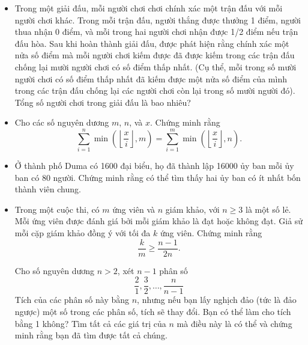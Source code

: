 \documentclass[11pt]{scrartcl}
\begin{document}
\begin{itemize}[label=, leftmargin=0em, itemsep=-0em]
    \item\begin{btvn}
        Trong một giải đấu, mỗi người chơi chơi chính xác một trận đấu với mỗi người chơi khác. Trong mỗi trận đấu, người thắng được thưởng 1 điểm, người thua nhận 0 điểm, và mỗi trong hai người chơi nhận được 1/2 điểm nếu trận đấu hòa. Sau khi hoàn thành giải đấu, được phát hiện rằng chính xác một nửa số điểm mà mỗi người chơi kiếm được đã được kiếm trong các trận đấu chống lại mười người chơi có số điểm thấp nhất. (Cụ thể, mỗi trong số mười người chơi có số điểm thấp nhất đã kiếm được một nửa số điểm của mình trong các trận đấu chống lại các người chơi còn lại trong số mười người đó). Tổng số người chơi trong giải đấu là bao nhiêu?
    \end{btvn}

    \item \begin{btvn}
        Cho các số nguyên dương $m$, $n$, và $x$. Chứng minh rằng
        \[ \sum_{i = 1}^n \min\left(\left\lfloor \frac{x}{i} \right\rfloor, m \right) = \sum_{i = 1}^m \min\left(\left\lfloor \frac{x}{i} \right\rfloor, n \right). \]
        
    \end{btvn}
    \item \begin{btvn}
        Ở thành phố Duma có 1600 đại biểu, họ đã thành lập 16000 ủy ban mỗi ủy ban có 80 người. Chứng minh rằng có thể tìm thấy hai ủy ban có ít nhất bốn thành viên chung.
    \end{btvn}
    \item \begin{btvn}
        Trong một cuộc thi, có $m$ ứng viên và $n$ giám khảo, với $n\geq 3$ là một số lẻ. Mỗi ứng viên được đánh giá bởi mỗi giám khảo là đạt hoặc không đạt. Giả sử mỗi cặp giám khảo đồng ý với tối đa $k$ ứng viên. Chứng minh rằng
        \[{\frac{k}{m}} \geq {\frac{n-1}{2n}}. \]
    \end{btvn}
    \begin{btvn}
        Cho số nguyên dương $n>2$, xét $n-1$ phân số
        \[
            \frac{2}{1},\frac{3}{2},\dots,\frac{n}{n - 1}
        \]
        Tích của các phân số này bằng $n$, nhưng nếu bạn lấy nghịch đảo (tức là đảo ngược) một số trong các phân số, tích sẽ thay đổi. Bạn có thể làm cho tích bằng 1 không? Tìm tất cả các giá trị của $n$ mà điều này là có thể và chứng minh rằng bạn đã tìm được tất cả chúng.
    \end{btvn}


\end{itemize}
\end{document}
